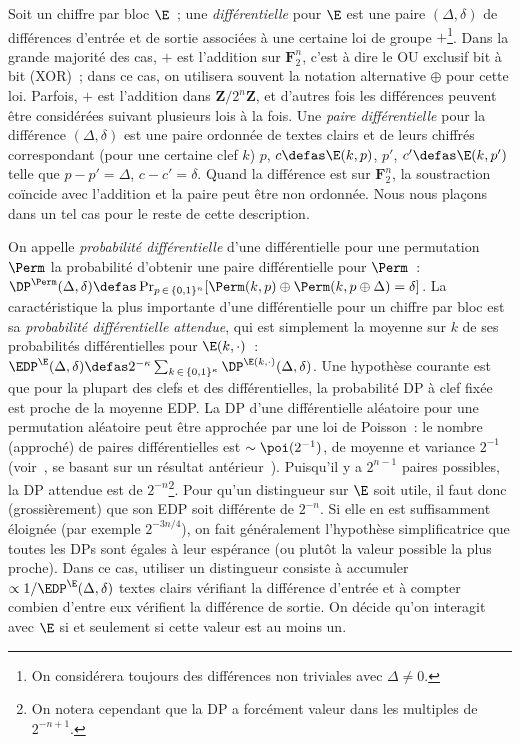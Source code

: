 Soit un chiffre par bloc $\E$~; une \emph{différentielle} pour $\E$ est une paire
$(\Delta,\delta)$ de différences d'entrée et de sortie associées à une certaine loi de groupe
$+$\footnote{On considérera toujours des différences non triviales avec $\Delta \neq 0$.}.
Dans la grande majorité des cas, $+$ est l'addition sur $\mathbf{F}_2^n$,
c'est à dire le OU exclusif bit à bit (XOR)~; dans ce cas, on utilisera souvent la notation alternative $\oplus$ pour cette loi.
Parfois, $+$ est l'addition dans $\mathbf{Z}/2^n\mathbf{Z}$, et d'autres fois les différences peuvent être considérées suivant plusieurs lois à la fois.
Une \emph{paire différentielle} pour la différence $(\Delta,\delta)$ est une paire ordonnée de textes clairs et de leurs chiffrés correspondant (pour une certaine clef $k$)
$p$, $c \defas \E(k,p)$, $p'$, $c' \defas \E(k,p')$ telle que $p - p' = \Delta$, $c - c' = \delta$. Quand la différence est sur $\mathbf{F}_2^n$,
la soustraction coïncide avec l'addition et la paire peut être non ordonnée. Nous nous plaçons dans un tel cas pour le reste de cette description.

On appelle \emph{probabilité différentielle} d'une différentielle pour une permutation $\Perm$ la probabilité d'obtenir une
paire différentielle pour $\Perm$~:
$\DP^{\Perm}(\Delta,\delta) \defas \Pr_{p\,\in\,\{0,1\}^n}[\Perm(k,p) \oplus \Perm(k,p \oplus \Delta) = \delta]$.
La caractéristique la plus importante d'une différentielle pour un chiffre par bloc est sa \emph{probabilité différentielle attendue},
qui est simplement la moyenne sur $k$ de ses probabilités différentielles pour $\E(k,\cdot)$~:
$\EDP^{\E}(\Delta,\delta) \defas 2^{-\kappa}\sum_{k\,\in\,\{0,1\}^\kappa} \DP^{\E(k,\cdot)}(\Delta,\delta)$.
Une hypothèse courante est que pour la plupart des clefs et des différentielles, la probabilité DP à clef fixée
est proche de la moyenne EDP.
La DP d'une différentielle aléatoire pour une permutation aléatoire peut être approchée par une loi de Poisson~:
le nombre (approché) de paires différentielles est
$\sim \poi(2^{-1})$, de moyenne et variance $2^{-1}$
(voir~\cite{DBLP:journals/jmc/DaemenR07}, se basant sur un résultat antérieur~\cite{DBLP:journals/joc/OConnor95}).
Puisqu'il y a
$2^{n-1}$ paires possibles, la DP attendue est de $2^{-n}$\footnote{On notera cependant que la DP a forcément valeur dans les multiples de $2^{-n+1}$.}.
Pour qu'un distingueur sur $\E$ soit utile, il faut donc (grossièrement) que son EDP soit différente de $2^{-n}$. Si elle en est suffisamment éloignée
(par exemple $2^{-3n/4}$), on fait généralement l'hypothèse simplificatrice que toutes les DPs sont égales à leur espérance (ou plutôt la valeur
possible la plus proche).
Dans ce cas,
utiliser un distingueur consiste à accumuler
$\propto 1/\EDP^{\E}(\Delta,\delta)$ textes clairs vérifiant la différence d'entrée et à compter combien d'entre eux vérifient la différence de sortie. On décide
qu'on interagit avec $\E$ si et seulement si cette valeur est au moins un.

